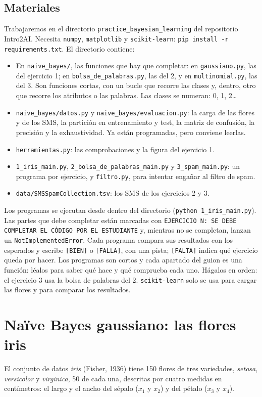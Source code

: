 \documentclass{article}
\begin{document}
\subsection*{Materiales}
Trabajaremos en el directorio \texttt{practice\_bayesian\_learning} del repositorio Intro2AI. Necesita \texttt{numpy}, \texttt{matplotlib} y \texttt{scikit-learn}: \texttt{pip install -r requirements.txt}. El directorio contiene:
\begin{itemize}
    \item En \texttt{naive\_bayes/}, las funciones que hay que completar: en \texttt{gaussiano.py}, las del ejercicio 1; en \texttt{bolsa\_de\_palabras.py}, las del 2, y en \texttt{multinomial.py}, las del 3. Son funciones cortas, con un bucle que recorre las clases y, dentro, otro que recorre los atributos o las palabras. Las clases se numeran: 0, 1, 2\dots
    \item \texttt{naive\_bayes/datos.py} y \texttt{naive\_bayes/evaluacion.py}: la carga de las flores y de los SMS, la partición en entrenamiento y test, la matriz de confusión, la precisión y la exhaustividad. Ya están programadas, pero conviene leerlas.
    \item \texttt{herramientas.py}: las comprobaciones y la figura del ejercicio 1.
    \item \texttt{1\_iris\_main.py}, \texttt{2\_bolsa\_de\_palabras\_main.py} y \texttt{3\_spam\_main.py}: un programa por ejercicio, y \texttt{filtro.py}, para intentar engañar al filtro de spam.
    \item \texttt{data/SMSSpamCollection.tsv}: los SMS de los ejercicios 2 y 3.
\end{itemize}
Los programas se ejecutan desde dentro del directorio (\texttt{python 1\_iris\_main.py}). Las partes que debe completar están marcadas con \texttt{EJERCICIO N: SE DEBE COMPLETAR EL CÓDIGO POR EL ESTUDIANTE} y, mientras no se completan, lanzan un \texttt{NotImplementedError}. Cada programa compara sus resultados con los esperados y escribe \texttt{[BIEN]} o \texttt{[FALLA]}, con una pista; \texttt{[FALTA]} indica qué ejercicio queda por hacer. Los programas son cortos y cada apartado del guion es una función: léalos para saber qué hace y qué comprueba cada uno. Hágalos en orden: el ejercicio 3 usa la bolsa de palabras del 2. \texttt{scikit-learn} solo se usa para cargar las flores y para comparar los resultados.


\section{Naïve Bayes gaussiano: las flores iris}
El conjunto de datos \textit{iris} (Fisher, 1936) tiene 150 flores de tres variedades, \textit{setosa}, \textit{versicolor} y \textit{virginica}, 50 de cada una, descritas por cuatro medidas en centímetros: el largo y el ancho del sépalo ($x_1$ y $x_2$) y del pétalo ($x_3$ y $x_4$).
\end{document}

